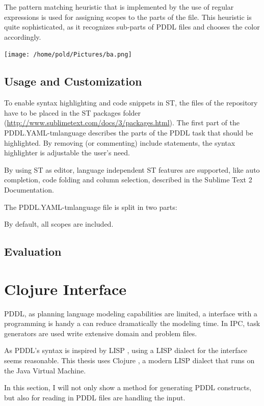 \documentclass[11pt]{report}
\begin{document}
The pattern matching heuristic that is implemented by the use of
regular expressions is used for assigning scopes to the parts of the
file. This heuristic is quite sophisticated, as it recognizes
sub-parts of PDDL files and chooses the color accordingly. 

\texttt{[image: /home/pold/Pictures/ba.png]}

\subsection{Usage and Customization}
\label{sec-4-2-2}
To enable syntax highlighting and code snippets in ST, the files of
the repository have to be placed in the ST packages folder
(\url{http://www.sublimetext.com/docs/3/packages.html}). The first part of the
PDDL.YAML-tmlanguage describes the parts of the PDDL task that should
be highlighted. By removing (or commenting) include statements, the
syntax highlighter is adjustable the user's need.

By using ST as editor, language independent ST features are supported,
like auto completion, code folding and column selection, described in
the Sublime Text 2 Documentation.



The PDDL.YAML-tmlanguage file is split in two parts:

By default, all scopes are included.

\subsection{Evaluation}
\label{sec-4-2-3}

\section{Clojure Interface}
\label{sec-4-3}

PDDL, as planning language modeling capabilities are limited, a
interface with a programming is handy a can reduce dramatically the
modeling time. In IPC, task generators are used write extensive domain
and problem files. 

As PDDL's syntax is inspired by LISP \parencite[64]{fox2003pddl2},
using a LISP dialect for the interface seems reasonable. This thesis
uses Clojure \parencite{hickey2008clojure}, a modern LISP
dialect that runs on the Java Virtual Machine.

In this section, I will not only show a method for generating PDDL
constructs, but also for reading in PDDL files are handling the input.
\end{document}
